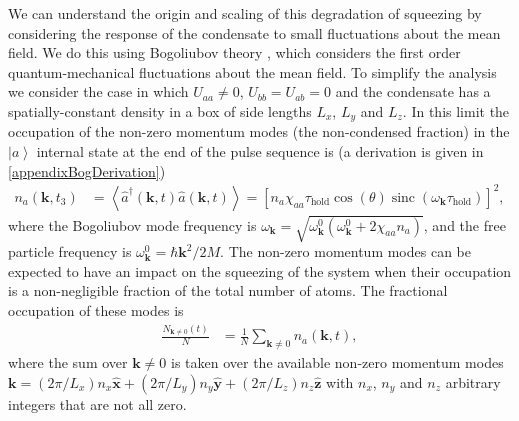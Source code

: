 \documentclass{iopart}
\DeclareMathOperator{\sinc}{sinc}
\newcommand{\expect}[1]{\ensuremath{\left<#1\right>}}
\newcommand{\ket}[1]{\ensuremath{\left|#1\right>}}
\begin{document}
We can understand the origin and scaling of this degradation of squeezing by considering the response of the condensate to small fluctuations about the mean field.  We do this using Bogoliubov theory \cite{PethickSmith}, which considers the first order quantum-mechanical fluctuations about the mean field.  To simplify the analysis we consider the case in which $U_{aa} \neq 0$, $U_{bb}=U_{ab} = 0$ and the condensate has a spatially-constant density in a box of side lengths $L_x$, $L_y$ and $L_z$.  In this limit the occupation of the non-zero momentum modes (the non-condensed fraction) in the $\ket{a}$ internal state at the end of the pulse sequence is (a derivation is given in \ref{appendixBogDerivation})
\begin{align}
  n_a(\mathbf{k}, t_3) &= \expect{\hat{a}^\dagger(\mathbf{k},t) \hat{a}(\mathbf{k},t)} = \left[n_a \chi_{aa} \tau_\text{hold} \cos(\theta) \sinc\left(\omega_\mathbf{k} \tau_\text{hold}\right) \right]^2, \label{eqBogOccupation}
\end{align}
where the Bogoliubov mode frequency is $\omega_\mathbf{k} = \sqrt{\omega^0_\mathbf{k}(\omega^0_\mathbf{k} + 2 \chi_{aa} n_a)}$, and the free particle frequency is $\omega^0_\mathbf{k} = \hbar \mathbf{k}^2/2 M$.  The non-zero momentum modes can be expected to have an impact on the squeezing of the system when their occupation is a non-negligible fraction of the total number of atoms.  The fractional occupation of these modes is
\begin{align}
  \frac{N_{\mathbf{k}\neq 0}(t)}{N} &= \frac{1}{N}\sum_{\mathbf{k}\neq 0} n_a(\mathbf{k}, t), \label{eqCondensateDepletion}
\end{align}
where the sum over $\mathbf{k} \neq 0$ is taken over the available non-zero momentum modes $\mathbf{k} = (2\pi/L_x) n_x \hat{\mathbf{x}} + (2\pi/L_y) n_y \hat{\mathbf{y}} + (2\pi/L_z) n_z \hat{\mathbf{z}}$ with $n_x$, $n_y$ and $n_z$ arbitrary integers that are not all zero.
\end{document}
